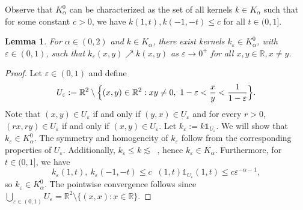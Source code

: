 \documentclass[12pt, a4paper]{amsart}
\newif\ifthesis
\newtheorem{lemma}[theorem]{Lemma}
\DeclareMathOperator{\Mass}{\nu_{\alpha}}
\newcommand{\R}{\mathbb{R}}
\begin{document}
 Observe that $K_\alpha^{0}$ can be characterized as the set of all kernels $k \in K_\alpha$ such that for some constant $c > 0$, we have $k(1, t), k(-1, -t) \leq c$ for all $t \in (0, 1]$.

\begin{lemma}
\label{lemma: aproksymacja k}
For $\alpha \in (0, 2)$ and $k \in K_\alpha$, there exist kernels $k_\varepsilon \in K_\alpha^0$, with $\varepsilon \in (0, 1)$, such that $k_\varepsilon(x, y) \nearrow k(x, y)$ as $\varepsilon \rightarrow 0^+$ for all $x, y \in \R, x \neq y$.
\end{lemma}

\begin{proof}
Let $\varepsilon \in (0, 1)$ and define
\begin{align*}
    U_\varepsilon := \R^2 \setminus \Bigl\{(x, y) \in \R^2 : xy \neq 0,\ 1 - \varepsilon < \frac{x}{y} < \frac{1}{1 - \varepsilon} \Bigr\}.
\end{align*}
Note that $(x, y) \in U_\varepsilon$ if and only if $(y, x) \in U_\varepsilon$ and for every $r > 0$, $(rx, ry) \in U_\varepsilon$ if and only if $(x, y) \in U_\varepsilon$. Let $k_\varepsilon := k\mathds{1}_{U_\varepsilon}$. We will show that $k_\varepsilon \in K_\alpha^0$. The symmetry and homogeneity of $k_\varepsilon$ follow from the corresponding properties of $U_\varepsilon$. Additionally, $k_\varepsilon \leq k \lesssim \Mass$, hence $k_\varepsilon \in K_\alpha$. Furthermore, for $t \in (0, 1]$, we have
\[
k_\varepsilon(1, t),\ k_\varepsilon(-1, -t) \leq c\Mass(1, t)\mathds{1}_{U_\varepsilon}(1, t) \leq c\varepsilon^{-\alpha - 1},
\]
so $k_\varepsilon \in K_\alpha^0$. The pointwise convergence follows since $\bigcup_{\varepsilon \in (0, 1)} U_\varepsilon = \R^2\setminus \{(x, x): x\in \R\}$.

\end{proof}
\ifthesis
\end{document}
